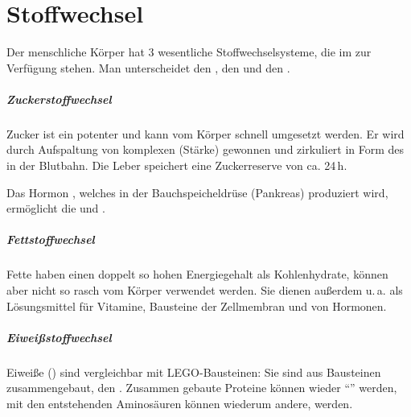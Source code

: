 \section{Stoffwechsel}
\label{topic:stoffwechsel}



{
Der menschliche Körper hat 3 wesentliche Stoffwechselsysteme, die im zur
Verfügung stehen. Man unterscheidet den , den  und den
.

\subparagraph{Zuckerstoffwechsel} Zucker ist ein potenter 
und kann vom Körper schnell umgesetzt werden. Er wird durch Aufspaltung von
komplexen  (Stärke) gewonnen und zirkuliert in Form des
 in der Blutbahn. Die Leber speichert eine Zuckerreserve von ca.
24\,h.

Das Hormon \label{topic:insulin}, welches in der Bauchspeicheldrüse
(Pankreas) produziert wird,  ermöglicht die  und . 

\subparagraph{Fettstoffwechsel} Fette haben einen doppelt so hohen Energiegehalt
als Kohlenhydrate, können aber nicht so rasch vom Körper verwendet werden.
Sie dienen außerdem u.\,a. als Lösungsmittel für Vitamine, Bausteine der
Zellmembran und von Hormonen. 

\subparagraph{Eiweißstoffwechsel} Eiweiße () sind vergleichbar mit
LEGO\texttrademark{}-Bausteinen: Sie sind aus Bausteinen zusammengebaut, den
. Zusammen gebaute Proteine können wieder "`"'
werden, mit den entstehenden Aminosäuren können wiederum andere,  werden. 

}
